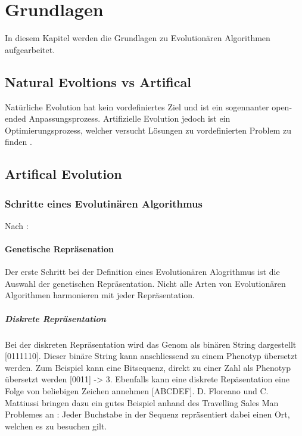 %
%


\chapter{Grundlagen}

In diesem Kapitel werden die Grundlagen zu Evolutionären Algorithmen aufgearbeitet.

\section{Natural Evoltions vs Artifical}
  Natürliche Evolution hat kein vordefiniertes Ziel und ist ein sogennanter open-ended Anpassungsprozess. Artifizielle Evolution jedoch ist ein Optimierungsprozess, welcher versucht Lösungen zu vordefinierten Problem zu finden \cite[S.1]{book:bioInspired}. \\

\section{Artifical Evolution}

  \subsection{Schritte eines Evolutinären Algorithmus}
  \label{sub:stepsEvAlgo}
    Nach \cite[S.16 - 29]{book:bioInspired}: \\

    \subsubsection{Genetische Repräsenation}
    Der erste Schritt bei der Definition eines Evolutionären Alogrithmus ist die Auswahl der genetischen Repräsentation.
    Nicht alle Arten von Evolutionären Algorithmen harmonieren mit jeder Repräsentation.

      \paragraph{Diskrete Repräsentation}
      \label{par:diskreteRepräsentation}
        Bei der diskreten Repräsentation wird das Genom als binären String dargestellt [0111110].
        Dieser binäre String kann anschliessend zu einem Phenotyp übersetzt werden.
        Zum Beispiel kann eine Bitsequenz, direkt zu einer Zahl als Phenotyp übersetzt werden [0011] -> 3.
        Ebenfalls kann eine diskrete Repäsentation eine Folge von beliebigen Zeichen annehmen [ABCDEF].
        D. Floreano und C. Mattiussi bringen dazu ein gutes Beispiel anhand des Travelling Sales Man Problemes an \cite[S.18]{book:bioInspired}:
        Jeder Buchstabe in der Sequenz repräsentiert dabei einen Ort, welchen es zu besuchen gilt.

